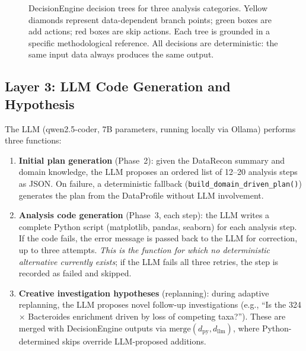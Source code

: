 \documentclass[11pt,a4paper]{article}
\begin{document}
\begin{figure}[t]
\caption{DecisionEngine decision trees for three analysis categories.
Yellow diamonds represent data-dependent branch points; green boxes
are add actions; red boxes are skip actions.
Each tree is grounded in a specific methodological reference.
All decisions are deterministic: the same input data always produces
the same output.}
\label{fig:decision-tree}
\end{figure}

\subsection{Layer 3: LLM Code Generation and Hypothesis}

The LLM (qwen2.5-coder, 7B parameters, running locally via Ollama)
performs three functions:

\begin{enumerate}
  \item \textbf{Initial plan generation} (Phase~2):
    given the DataRecon summary and domain knowledge, the LLM
    proposes an ordered list of 12--20 analysis steps as JSON.
    On failure, a deterministic fallback
    (\texttt{build\_domain\_driven\_plan()}) generates the plan
    from the DataProfile without LLM involvement.
  \item \textbf{Analysis code generation} (Phase~3, each step):
    the LLM writes a complete Python script (matplotlib, pandas,
    seaborn) for each analysis step.
    If the code fails, the error message is passed back to the LLM
    for correction, up to three attempts.
    \textit{This is the function for which no deterministic
    alternative currently exists}; if the LLM fails all three
    retries, the step is recorded as failed and skipped.
  \item \textbf{Creative investigation hypotheses} (replanning):
    during adaptive replanning, the LLM proposes novel follow-up
    investigations (e.g., ``Is the 324$\times$ Bacteroides
    enrichment driven by loss of competing taxa?'').
    These are merged with DecisionEngine outputs via
    $\mathrm{merge}(d_{\mathrm{py}}, d_{\mathrm{llm}})$, where
    Python-determined skips override LLM-proposed additions.
\end{enumerate}
\end{document}
